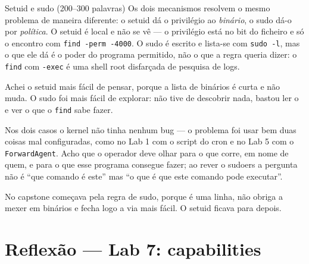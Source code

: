 \documentclass[a4paper,11pt]{article}
\newcommand{\cmd}[1]{\textcolor{sscnblue}{\texttt{#1}}}
\newcommand{\file}[1]{\texttt{\detokenize{#1}}}
\begin{document}
\begin{callout}{Setuid e sudo (200--300 palavras)}
\setlength{\parskip}{5pt}%
Os dois mecanismos resolvem o mesmo problema de maneira diferente: o setuid d\'a o
privil\'egio ao \emph{bin\'ario}, o sudo d\'a-o por \emph{pol\'itica}. O setuid \'e local e
n\~ao se v\^e --- o privil\'egio est\'a no bit do ficheiro e s\'o o encontro com
\cmd{find -perm -4000}. O sudo \'e escrito e lista-se com \cmd{sudo -l}, mas o que ele
d\'a \'e o poder do programa permitido, n\~ao o que a regra queria dizer: o \cmd{find} com
\cmd{-exec} \'e uma shell root disfar\c{c}ada de pesquisa de logs.

Achei o setuid mais f\'acil de pensar, porque a lista de bin\'arios \'e curta e n\~ao muda.
O sudo foi mais f\'acil de explorar: n\~ao tive de descobrir nada, bastou ler o
\file{/etc/sudoers.d} e ver o que o \cmd{find} sabe fazer.

Nos dois casos o kernel n\~ao tinha nenhum bug --- o problema foi usar bem duas coisas
mal configuradas, como no Lab 1 com o script do cron e no Lab 5 com o
\cmd{ForwardAgent}. Acho que o operador deve olhar para o que corre, em nome de quem, e
para o que esse programa consegue fazer; ao rever o sudoers a pergunta n\~ao \'e ``que
comando \'e este'' mas ``o que \'e que este comando pode executar''.

No capstone come\c{c}ava pela regra de sudo, porque \'e uma linha, n\~ao obriga a mexer em
bin\'arios e fecha logo a via mais f\'acil. O setuid ficava para depois.
\end{callout}

\section{Reflex\~ao --- Lab 7: capabilities}
\end{document}
